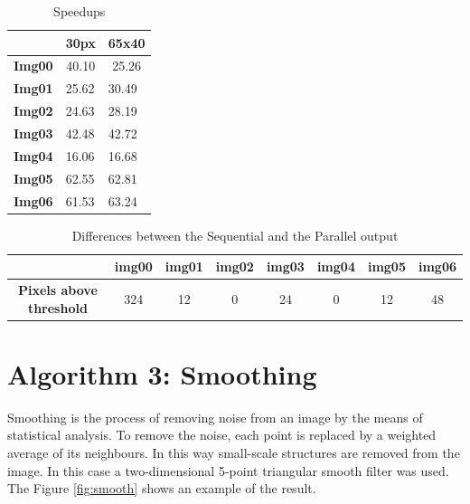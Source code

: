 \documentclass[a4paper]{article}
\begin{document}
\begin{table}[!ht]
\centering
\begin{tabular}{|l|l|l|}
\hline
\multicolumn{1}{|c|}{}               & \textbf{30px}              & \multicolumn{1}{c|}{\textbf{65x40}} \\ \hline
\multicolumn{1}{|c|}{\textbf{Img00}} & \multicolumn{1}{c|}{40.10} & \multicolumn{1}{c|}{25.26}          \\ \hline
\textbf{Img01}                       & 25.62                      & 30.49                               \\ \hline
\textbf{Img02}                       & 24.63                      & 28.19                               \\ \hline
\textbf{Img03}                       & 42.48                      & 42.72                               \\ \hline
\textbf{Img04}                       & 16.06                      & 16.68                               \\ \hline
\textbf{Img05}                       & 62.55                      & 62.81                               \\ \hline
\textbf{Img06}                       & 61.53                      & 63.24                               \\ \hline
\end{tabular}
\caption{Speedups}
\label{tab:histo_sp}
\end{table}
\FloatBarrier


\begin{table}[!ht]
\centering
\begin{tabular}{|c|l|c|c|l|l|l|l|}
\hline
\textbf{}                        & \textbf{img00}           & \textbf{img01} & \textbf{img02} & \textbf{img03}          & \textbf{img04}         & \textbf{img05}          & \textbf{img06}          \\ \hline
\textbf{Pixels above  threshold} & \multicolumn{1}{c|}{324} & 12             & 0              & \multicolumn{1}{c|}{24} & \multicolumn{1}{c|}{0} & \multicolumn{1}{c|}{12} & \multicolumn{1}{c|}{48} \\ \hline
\end{tabular}
\caption{Differences between the Sequential and the Parallel output}
\label{tab:pxabh}
\end{table}
\FloatBarrier
 

\section{Algorithm 3: Smoothing}
\label{sec:smoo}
Smoothing is the process of removing noise from an image by the means of statistical analysis. To remove the noise, each point is replaced by a weighted average of its neighbours. In this way small-scale structures are removed from the image. In this case a two-dimensional 5-point triangular smooth filter was used. The Figure \ref{fig:smooth} shows an example of the result.
\end{document}
